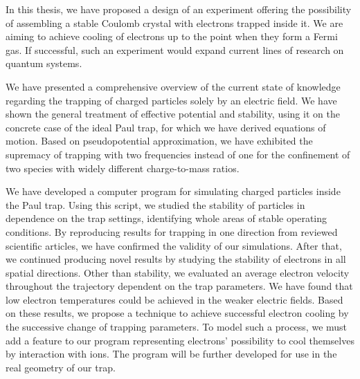
In this thesis, we have proposed a design of an experiment offering the possibility of assembling a stable Coulomb crystal with electrons trapped inside it. We are aiming to achieve cooling of electrons up to the point when they form a Fermi gas. If successful, such an experiment would expand current lines of research on quantum systems. 

We have presented a comprehensive overview of the current state of knowledge regarding the trapping of charged particles solely by an electric field. We have shown the general treatment of effective potential and stability, using it on the concrete case of the ideal Paul trap, for which we have derived equations of motion. Based on pseudopotential approximation, we have exhibited the supremacy of trapping with two frequencies instead of one for the confinement of two species with widely different charge-to-mass ratios.

We have developed a computer program for simulating charged particles inside the Paul trap. Using this script, we studied the stability of particles in dependence on the trap settings, identifying whole areas of stable operating conditions. By reproducing results for trapping in one direction from reviewed scientific articles, we have confirmed the validity of our simulations. After that, we continued producing novel results by studying the stability of electrons in all spatial directions. Other than stability, we evaluated an average electron velocity throughout the trajectory dependent on the trap parameters. We have found that low electron temperatures could be achieved in the weaker electric fields. Based on these results, we propose a technique to achieve successful electron cooling by the successive change of trapping parameters. To model such a process, we must add a feature to our program representing electrons' possibility to cool themselves by interaction with ions. The program will be further developed for use in the real geometry of our trap. 
